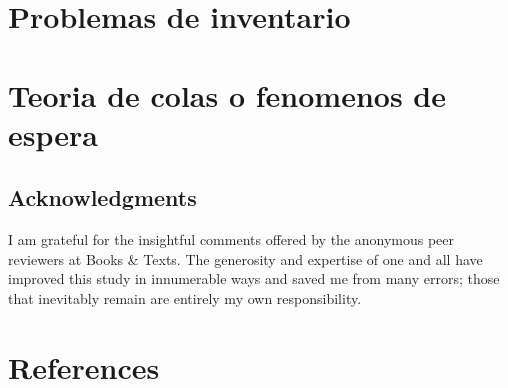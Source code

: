 \documentclass[
  letterpaper,
  DIV=11,
  numbers=noendperiod]{scrreprt}
\newlength{\cslhangindent}
\newlength{\cslentryspacingunit} %
\newenvironment{CSLReferences}[2] %
 {%
  \setlength{\parindent}{0pt}
  \ifodd #1
  \let\oldpar\par
  \def\par{\hangindent=\cslhangindent\oldpar}
  \fi
  \setlength{\parskip}{#2\cslentryspacingunit}
 }%
 {}
\theoremstyle{definition}
\theoremstyle{definition}
\theoremstyle{remark}
\begin{document}
\hypertarget{problemas-de-inventario}{%
\chapter{Problemas de inventario}\label{problemas-de-inventario}}

\hypertarget{teoria-de-colas-o-fenomenos-de-espera}{%
\chapter{Teoria de colas o fenomenos de
espera}\label{teoria-de-colas-o-fenomenos-de-espera}}

\hypertarget{acknowledgments}{%
\section{Acknowledgments}\label{acknowledgments}}

I am grateful for the insightful comments offered by the anonymous peer
reviewers at Books \& Texts. The generosity and expertise of one and all
have improved this study in innumerable ways and saved me from many
errors; those that inevitably remain are entirely my own responsibility.


\hypertarget{references}{%
\chapter*{References}\label{references}}


\hypertarget{refs}{}
\begin{CSLReferences}{0}{0}
\end{CSLReferences}

\appendix
{}


\printbibliography[title=apendice]
\end{document}
